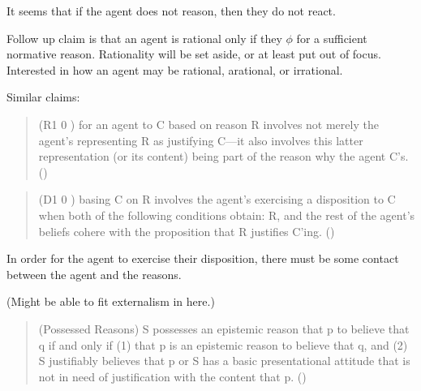 \documentclass[10pt]{article}
\begin{document}
It seems that if the agent does not reason, then they do not react.

Follow up claim is that an agent is rational only if they \(\phi\) for a sufficient normative reason.
Rationality will be set aside, or at least put out of focus.
Interested in how an agent may be rational, arational, or irrational.

Similar claims:

\begin{quote}
  (R1 0 ) for an agent to C based on reason R involves not merely the agent’s representing R as justifying C—it also involves this latter representation (or its content) being part of the reason why the agent C’s.\nolinebreak
  \mbox{}\hfill\mbox{(\citeyear[197]{Neta:2019aa})}
\end{quote}

\begin{quote}
  (D1 0 ) basing C on R involves the agent’s exercising a disposition to C when both of the following conditions obtain: R, and the rest of the agent’s beliefs cohere with the proposition that R justiﬁes C’ing.\nolinebreak
  \mbox{}\hfill\mbox{(\citeyear[194]{Neta:2019aa})}
\end{quote}

In order for the agent to exercise their disposition, there must be some contact between the agent and the reasons.

(Might be able to fit externalism in here.)

\begin{quote}
  (Possessed Reasons) S possesses an epistemic reason that p to believe that q if and only if (1) that p is an epistemic reason to believe that q, and (2) S justiﬁably believes that p or S has a basic presentational attitude that is not in need of justiﬁcation with the content that p.\nolinebreak
  \mbox{}\hfill\mbox{(\citeyear[5]{Schmidt:2019aa})}
\end{quote}
\end{document}
